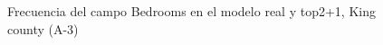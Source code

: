 \begin{figure}[H]
    \centering
    
    \caption{Frecuencia del campo Bedrooms en el modelo real y top2+1, King county (A-3)}
    \label{frecuency-top2+1-bedrooms}
\end{figure}